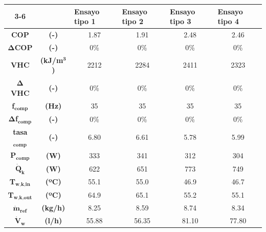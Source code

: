 
\begin{tabular}{cc|c|c|c|c|}
\cline{3-6}
\multicolumn{1}{l}{} & \multicolumn{1}{l|}{} & \multicolumn{1}{l|}{\textbf{Ensayo tipo 1}} & \multicolumn{1}{l|}{\textbf{Ensayo tipo 2}} & \multicolumn{1}{l|}{\textbf{Ensayo tipo 3}} & \multicolumn{1}{l|}{\textbf{Ensayo tipo 4}} \\ \hline
\multicolumn{1}{|c}{\textbf{COP}} & \textbf{(-)} & 1.87 & 1.91 & 2.48 & 2.46 \\ \hline
\multicolumn{1}{|c}{$\bm{\Delta}$\textbf{COP}} & \textbf{(-)} & 0\% & 0\% & 0\% & 0\% \\ \hline
\multicolumn{1}{|c}{\textbf{VHC}} & \textbf{(kJ/m$^\textbf{3}$)} & 2212 & 2284 & 2411 & 2323 \\ \hline
\multicolumn{1}{|c}{$\bm{\Delta}$\textbf{VHC}} & \textbf{(-)} & 0\% & 0\% & 0\% & 0\% \\ \hline
\multicolumn{1}{|c}{\textbf{f}$_\textbf{comp}$} & \textbf{(Hz)} & 35 & 35 & 35 & 35 \\ \hline
\multicolumn{1}{|c}{$\bm{\Delta}$\textbf{f}$_\textbf{comp}$} & \textbf{(-)} & 0\% & 0\% & 0\% & 0\% \\ \hline
\multicolumn{1}{|c}{\textbf{tasa}$_\textbf{comp}$} & \textbf{(-)} & 6.80 & 6.61 & 5.78 & 5.99 \\ \hline
\multicolumn{1}{|c}{\textbf{P}$_\textbf{comp}$} & \textbf{(W)} & 333 & 341 & 312 & 304 \\ \hline
\multicolumn{1}{|c}{$\dot{\textbf{Q}}_\textbf{k}$} & \textbf{(W)} & 622 & 651 & 773 & 749 \\ \hline
\multicolumn{1}{|c}{\textbf{T}$_\textbf{w,k,in}$} & \textbf{(ºC)} & 55.1 & 55.0 & 46.9 & 46.7 \\ \hline
\multicolumn{1}{|c}{\textbf{T}$_\textbf{w,k,out}$} & \textbf{(ºC)} & 64.9 & 65.1 & 55.2 & 55.1 \\ \hline
\multicolumn{1}{|c}{$\dot{\textbf{m}}_\textbf{ref}$} & \textbf{(kg/h)} & 8.25 & 8.59 & 8.74 & 8.34 \\ \hline
\multicolumn{1}{|c}{$\dot{\textbf{V}}_\textbf{w}$} & \textbf{(l/h)} & 55.88 & 56.35 & 81.10 & 77.80 \\ \hline
\end{tabular}
